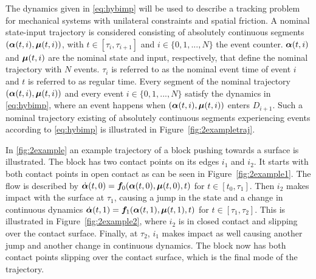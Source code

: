\documentclass[../DC2017114Bouma.tex]{subfiles}
\begin{document}
The dynamics given in \eqref{eq:hybimp} will be used to describe a tracking problem for mechanical systems with unilateral constraints and spatial friction. A nominal state-input trajectory is considered consisting of absolutely continuous segments $(\boldsymbol{\alpha}(t,i),\boldsymbol{\mu}(t,i))$, with $t\in\left[\tau_i,\tau_{i+1}\right]$ and $i\in\{0,1,...,N\}$ the event counter. $\boldsymbol{\alpha}(t,i)$ and $\boldsymbol{\mu}(t,i)$ are the nominal state and input, respectively, that define the nominal trajectory with $N$ events. $\tau_i$ is referred to as the nominal event time of event $i$ and $t$ is referred to as regular time. Every segment of the nominal trajectory $(\boldsymbol{\alpha}(t,i),\boldsymbol{\mu}(t,i))$ and every event $i\in\{0,1,...,N\}$ satisfy the dynamics in \eqref{eq:hybimp}, where an event happens when $(\boldsymbol{\alpha}(t,i),\boldsymbol{\mu}(t,i))$ enters $D_{i+1}$. Such a nominal trajectory existing of absolutely continuous segments experiencing events according to \eqref{eq:hybimp} is illustrated in Figure~\ref{fig:2exampletraj}.

In \ref{fig:2example} an example trajectory of a block pushing towards a surface is illustrated. The block has two contact points on its edges $i_1$ and $i_2$. It starts with both contact points in open contact as can be seen in Figure~\ref{fig:2example1}. The flow is described by $\dot{\boldsymbol{\alpha}}(t,0) = {\boldsymbol{f}}_0(\boldsymbol{\alpha}(t,0),\boldsymbol{\mu}(t,0),t)$ for $t\in[t_0,\tau_1]$. Then $i_2$ makes impact with the surface at $\tau_1$, causing a jump in the state and a change in continuous dynamics $\dot{\boldsymbol{\alpha}}(t,1) = {\boldsymbol{f}}_1(\boldsymbol{\alpha}(t,1),\boldsymbol{\mu}(t,1),t)$ for $t\in[\tau_1,\tau_2]$. This is illustrated in Figure~\ref{fig:2example2}, where $i_2$ is in closed contact and slipping over the contact surface. Finally, at $\tau_2$, $i_1$ makes impact as well causing another jump and another change in continuous dynamics. The block now has both contact points slipping over the contact surface, which is the final mode of the trajectory.
\end{document}
